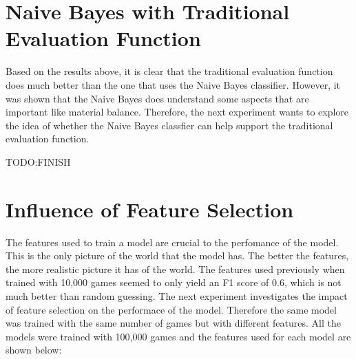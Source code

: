 


\section{Naive Bayes with Traditional Evaluation Function}

Based on the results above, it is clear that the traditional evaluation function does much better than the one that uses the Naive Bayes classifier. However, it was shown that the Naive Bayes does understand some aspects that are important like material balance. Therefore, the next experiment wants to explore the idea of whether the Naive Bayes classfier can help support the traditional evaluation function. 

TODO:FINISH

\section{Influence of Feature Selection}

The features used to train a model are crucial to the perfomance of the model. This is the only picture of the world that the model has. The better the features, the more realistic picture it has of the world. The features used previously when trained with 10,000 games seemed to only yield an F1 score of 0.6, which is not much better than random guessing. The next experiment investigates the impact of feature selection on the performace of the model.
Therefore the same model was trained with the same number of games but with different features. 
All the models were trained with 100,000 games and the features used for each model are shown below:

